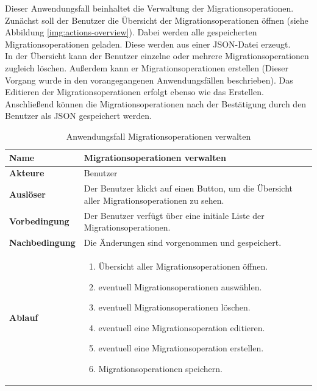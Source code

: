 Dieser Anwendungsfall beinhaltet die Verwaltung der Migrationsoperationen. Zunächst soll der Benutzer die Übersicht der Migrationsoperationen öffnen (siehe Abbildung \ref{img:actions-overview}). Dabei werden alle gespeicherten Migrationsoperationen geladen. Diese werden aus einer JSON-Datei erzeugt.\\ In der Übersicht kann der Benutzer einzelne oder mehrere Migrationsoperationen zugleich löschen. Außerdem kann er Migrationsoperationen erstellen (Dieser Vorgang wurde in den vorangegangenen Anwendungsfällen beschrieben). Das Editieren der Migrationsoperationen erfolgt ebenso wie das Erstellen.\\
Anschließend können die Migrationsoperationen nach der Bestätigung durch den Benutzer als JSON gespeichert werden.
\begin{table}[H]
	\centering
	\begin{tabular}{ |p{4cm}|p{8cm}| }
		\hline
		\textbf{Name} & Migrationsoperationen verwalten  \\
		\hline
		\textbf{Akteure} &  Benutzer \\
		\hline
		\textbf{Auslöser} &  Der Benutzer klickt auf einen Button, um die Übersicht aller Migrationsoperationen zu sehen. \\
		\hline
		\textbf{Vorbedingung} & Der Benutzer verfügt über eine initiale Liste der Migrationsoperationen.  \\
		\hline
		\textbf{Nachbedingung} & Die Änderungen sind vorgenommen und gespeichert.  \\
		\hline
		\textbf{Ablauf} & 
		\begin{enumerate}
			\item Übersicht aller Migrationsoperationen öffnen.
			\item eventuell Migrationsoperationen auswählen.
			\item eventuell Migrationsoperationen löschen.
			\item eventuell eine Migrationsoperation editieren.
			\item eventuell eine Migrationsoperation erstellen.
			\item Migrationsoperationen speichern.
		\end{enumerate}   \\
		\hline
		
	\end{tabular}
	\caption{Anwendungsfall Migrationsoperationen verwalten}
	\label{table:ks-speichern}
\end{table}



